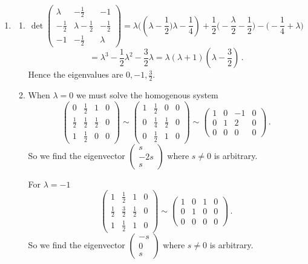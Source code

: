 \begin{enumerate}
\item 
\begin{enumerate}
\item
\[
\det\begin{pmatrix} \lambda&-\frac12 & -1 \\[2mm] -\frac12 &\lambda-\frac12 &-\frac12 \\[2mm] -1 & -\frac12 &\lambda\end{pmatrix}
=\lambda\Big((\lambda-\frac12\Big)\lambda-\frac14)+\frac12\Big(-\frac{\lambda}2-\frac12\Big)-\Big(-\frac14+\lambda\Big)
\]
\[
=\lambda^3-\frac{1}{2}\lambda^2-\frac32 \lambda=\lambda(\lambda+1)(\lambda-\frac32)\, .
\]
Hence the eigenvalues are $0,-1,\frac32$.
\item
When $\lambda=0$ we must solve the homogenous system
\[
\left(
\begin{array}{ccc|c}
0&\frac12&1&0\\[1mm]
\frac12&\frac12&\frac12&0\\[1mm]
1&\frac12&0&0
\end{array}\right)
\sim
\left(
\begin{array}{ccc|c}
1&\frac12&0&0\\[1mm]
0&\frac14&\frac12&0\\[1mm]
0&\frac12&1&0
\end{array}\right)
\sim
\left(
\begin{array}{ccc|c}
1&0&-1&0\\[1mm]
0&1&2&0\\[1mm]
0&0&0&0
\end{array}\right)\, .
\]
So we find the eigenvector $\begin{pmatrix}s\\-2s\\s\end{pmatrix}$ where $s\neq 0$ is arbitrary.

For $\lambda=-1$ 
\[
\left(
\begin{array}{ccc|c}
1&\frac12&1&0\\[1mm]
\frac12&\frac32&\frac12&0\\[1mm]
1&\frac12&1&0
\end{array}\right)
\sim
\left(
\begin{array}{ccc|c}
1&0&1&0\\[1mm]
0&1&0&0\\[1mm]
0&0&0&0
\end{array}\right)
\, .
\]
So we find the eigenvector $\begin{pmatrix}-s\\0\\s\end{pmatrix}$ where $s\neq 0$ is arbitrary.


\end{enumerate}
\end{enumerate}
